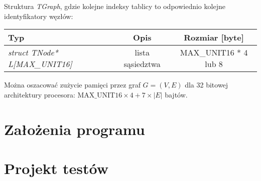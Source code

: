 \documentclass[a4paper, 10pt]{article}
\begin{document}
Struktura {\it TGraph}, gdzie kolejne indeksy tablicy to odpowiednio kolejne identyfikatory węzłów:

\begin{tabular}{|l|c|c|}
\hline {\bf Typ} & {\bf Opis} & {\bf Rozmiar [byte]}\\
  \hline 
   \it{struct TNode* L[MAX\_UNIT16]  } & lista sąsiedztwa & MAX\_UNIT16 * 4 lub 8 \\
  \hline
\end{tabular} 

Można oszacować zużycie pamięci przez graf $G=(V,E)$ dla 32 bitowej architektury procesora: $\text{MAX\_UNIT16}\times4+7\times|E|$ bajtów.



\section{Założenia programu}
\section{Projekt testów}
	
	





\nocite{*}

\end{document}
